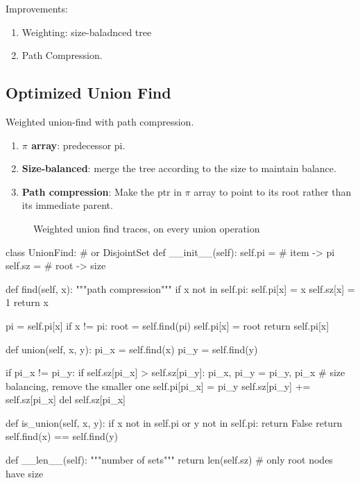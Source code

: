 Improvements:
\begin{enumerate}
\item Weighting: size-baladnced tree
\item Path Compression.
\end{enumerate}
\subsection{Optimized Union Find}
Weighted union-find with path compression.\\
\begin{enumerate}
\item \textbf{$\pi$ array}: predecessor pi.
\item \textbf{Size-balanced}: merge the tree according to the size to maintain balance.
\item \textbf{Path compression}: Make the ptr in $\pi$ array to point to its root rather than its immediate parent.
\end{enumerate}
\begin{figure}[]
\centering
\subfloat{\texttt{[image: uf]}}
\caption{Weighted union find traces, on every union operation}
\label{fig:union_find}
\end{figure}

\begin{python}
class UnionFind:  # or DisjointSet
  def __init__(self):
    self.pi = {}  # item -> pi
    self.sz = {}  # root -> size

  def find(self, x):
    """path compression"""
    if x not in self.pi:
      self.pi[x] = x
      self.sz[x] = 1
      return x

    pi = self.pi[x]
    if x != pi:
      root = self.find(pi)
      self.pi[x] = root
    return self.pi[x]

  def union(self, x, y):
    pi_x = self.find(x)
    pi_y = self.find(y)

    if pi_x != pi_y:
      if self.sz[pi_x] > self.sz[pi_y]:
        pi_x, pi_y = pi_y, pi_x
        # size balancing, remove the smaller one
      self.pi[pi_x] = pi_y
      self.sz[pi_y] += self.sz[pi_x]
      del self.sz[pi_x]

  def is_union(self, x, y):
    if x not in self.pi or y not in self.pi:
      return False
    return self.find(x) == self.find(y)

  def __len__(self):
    """number of sets"""
    return len(self.sz)  # only root nodes have size
\end{python}

